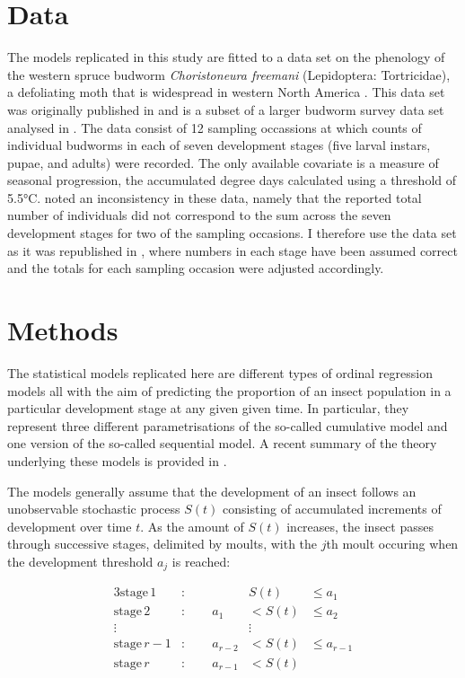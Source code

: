 \section{Data}
The models replicated in this study are fitted to a data set on the phenology of the western spruce budworm \emph{Choristoneura freemani} (Lepidoptera: Tortricidae), a defoliating moth that is widespread in western North America \citep{brookes1987western}. This data set was originally published in \citep{dennis1986stochastic} and is a subset of a larger budworm survey data set analysed in \citep{kemp1986stochastic}. The data consist of 12 sampling occassions at which counts of individual budworms in each of seven development stages (five larval instars, pupae, and adults) were recorded. The only available covariate is a measure of seasonal progression, the accumulated degree days calculated using a threshold of 5.5°C. \citet{candy1991modeling} noted an inconsistency in these data, namely that the reported total number of individuals did not correspond to the sum across the seven development stages for two of the sampling occasions. I therefore use the data set as it was republished in \citep{candy1990biology}, where numbers in each stage have been assumed correct and the totals for each sampling occasion were adjusted accordingly.

\section{Methods}
The statistical models replicated here are different types of ordinal regression models \citep{agresti2010analysis} all with the aim of predicting the proportion of an insect population in a particular development stage at any given given time. In particular, they represent three different parametrisations of the so-called cumulative model and one version of the so-called sequential model. A recent summary of the theory underlying these models is provided in \citep{burkner2019ordinal}.

The models generally assume that the development of an insect follows an unobservable stochastic process $S(t)$ consisting of accumulated increments of development over time $t$. As the amount of $S(t)$ increases, the insect passes through successive stages, delimited by moults, with the $j$th moult occuring when the development threshold $a_j$ is reached:

\begin{alignat*}{3}
  \mathrm{stage}\,1&:\qquad {}&   S(t) & \leq a_1 \\
  \mathrm{stage}\,2&:\qquad  a_1&< S(t) & \leq a_2 \\
  \vdots & &\vdots \\
  \mathrm{stage}\,r-1&:\qquad  a_{r-2}&< S(t) & \leq a_{r-1} \\
  \mathrm{stage}\,r&:\qquad  a_{r-1}&< S(t) 
\end{alignat*}

